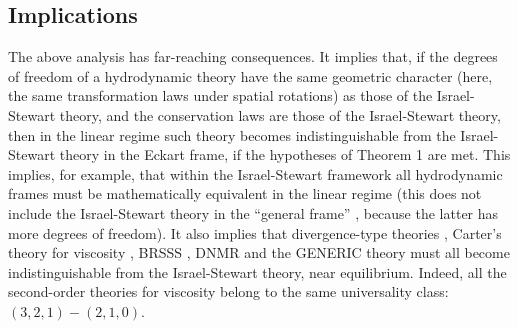\documentclass[a4paper, amsfonts, amssymb, amsmath, reprint, showkeys, nofootinbib, twoside, onecolumn,notitlepage]{revtex4-1}
\begin{document}

\subsection{Implications}

The above analysis has far-reaching consequences. It implies that, if the degrees of freedom of a hydrodynamic theory have the same geometric character (here, the same transformation laws under spatial rotations) as those of the Israel-Stewart theory, and the conservation laws are those of the Israel-Stewart theory, then in the linear regime such theory becomes indistinguishable from the Israel-Stewart theory in the Eckart frame, if the hypotheses of Theorem 1 \cite{paperI} are met. This implies, for example, that within the Israel-Stewart framework all hydrodynamic frames must be mathematically equivalent in the linear regime \cite{GavassinoNonHydro2022} (this does not include the Israel-Stewart theory in the ``general frame'' \cite{NoronhaGeneralFrame2021}, because the latter has more degrees of freedom). It also implies that divergence-type theories \cite{Geroch1995}, Carter's theory for viscosity \cite{carter1991}, BRSSS \cite{Baier2008}, DNMR \cite{Denicol2012Boltzmann} and the GENERIC theory \cite{Stricker2019} must all become indistinguishable from the Israel-Stewart theory, near equilibrium. Indeed, all the second-order theories for viscosity belong to the same universality class: $(3,2,1)-(2,1,0)$.
\end{document}
